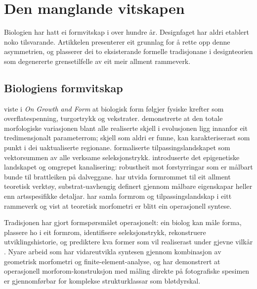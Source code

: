 \documentclass[10pt,a4paper,twocolumn]{article}
\begin{document}
\section{Den manglande vitskapen}

Biologien har hatt ei formvitskap i over hundre år. Designfaget har aldri etablert noko tilsvarande. Artikkelen presenterer eit grunnlag for å rette opp denne asymmetrien, og plasserer dei to eksisterande formelle tradisjonane i designteorien som degenererte grensetilfelle av eit meir allment rammeverk.

\subsection{Biologiens formvitskap}

\citet{thompson1917} viste i \textit{On Growth and Form} at biologisk form følgjer fysiske krefter som overflatespenning, turgortrykk og vekstrater. \citet{raup1966} demonstrerte at den totale morfologiske variasjonen blant alle realiserte skjell i evolusjonen ligg innanfor eit tredimensjonalt parameterrom; skjell som aldri er funne, kan karakteriserast som punkt i dei uaktualiserte regionane. \citet{wright1932} formaliserte tilpassingslandskapet som vektorsummen av alle verksame seleksjonstrykk. \citet{waddington1957} introduserte det epigenetiske landskapet og omgrepet kanalisering: robustheit mot forstyrringar som er målbart bunde til brattleiken på dalveggane. \citet{mitteroecker2009} har utvida formrommet til eit allment teoretisk verktøy, substrat-uavhengig definert gjennom målbare eigenskapar heller enn artsspesifikke detaljar. \citet{mcghee2007} har samla formrom og tilpassingslandskap i eitt rammeverk og vist at teoretisk morfometri er blitt ein operasjonell syntese.

Tradisjonen har gjort formspørsmålet operasjonelt: ein biolog kan måle forma, plassere ho i eit formrom, identifisere seleksjonstrykk, rekonstruere utviklingshistorie, og prediktere kva former som vil realiserast under gjevne vilkår \citep{arnold2001, wagner2005}. Nyare arbeid som \citet{polly2016} har vidareutvikla syntesen gjennom kombinasjon av geometrisk morfometri og finite-element-analyse, og \citet{contrerasfigueroa2023} har demonstrert at operasjonell morforom-konstruksjon med måling direkte på fotografiske spesimen er gjennomførbar for komplekse strukturklassar som bløtdyrskal.
\end{document}
